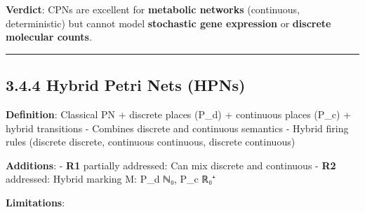 \textbf{Verdict}: CPNs are excellent for \textbf{metabolic networks}
(continuous, deterministic) but cannot model \textbf{stochastic gene
expression} or \textbf{discrete molecular counts}.

\begin{center}\rule{0.5\linewidth}{0.5pt}\end{center}

\hypertarget{hybrid-petri-nets-hpns}{%
\subsection{3.4.4 Hybrid Petri Nets
(HPNs)}\label{hybrid-petri-nets-hpns}}

\textbf{Definition}: Classical PN + discrete places (P\_d) + continuous
places (P\_c) + hybrid transitions - Combines discrete and continuous
semantics - Hybrid firing rules (discrete \textrightarrow discrete, continuous \textrightarrow
continuous, discrete \textrightarrow continuous)

\textbf{Additions}: - \checkmark \textbf{R1} partially addressed: Can mix
discrete and continuous - \checkmark \textbf{R2} addressed: Hybrid marking M:
P\_d \textrightarrow ℕ₀, P\_c \textrightarrow ℝ₀⁺

\textbf{Limitations}:

